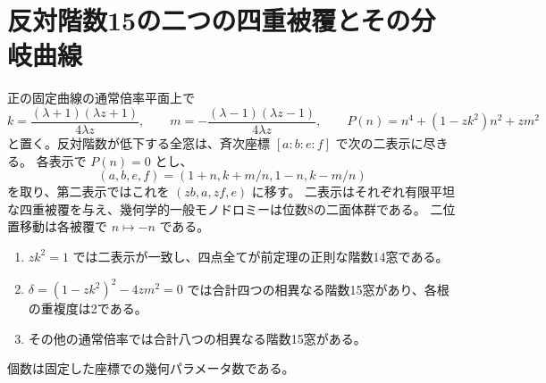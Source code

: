 \section{反対階数15の二つの四重被覆とその分岐曲線}
\label{sec:rank-fifteen-covers}
\begin{theorem}\label{thm:rank-fifteen-covers}
正の固定曲線の通常倍率平面上で
\[
 k=\frac{(\lambda+1)(\lambda z+1)}{4\lambda z},\qquad
 m=-\frac{(\lambda-1)(\lambda z-1)}{4\lambda z},\qquad
 P(n)=n^4+(1-zk^2)n^2+zm^2
\]
と置く。反対階数が低下する全窓は、斉次座標 $[a:b:e:f]$ で次の二表示に尽きる。
各表示で $P(n)=0$ とし、
\[
 (a,b,e,f)=(1+n,k+m/n,1-n,k-m/n)
\]
を取り、第二表示ではこれを $(zb,a,zf,e)$ に移す。
二表示はそれぞれ有限平坦な四重被覆を与え、幾何学的一般モノドロミーは位数8の二面体群である。
二位置移動は各被覆で $n\mapsto-n$ である。
\begin{enumerate}
\item $zk^2=1$ では二表示が一致し、四点全てが前定理の正則な階数14窓である。
\item $\delta=(1-zk^2)^2-4zm^2=0$ では合計四つの相異なる階数15窓があり、各根の重複度は2である。
\item その他の通常倍率では合計八つの相異なる階数15窓がある。
\end{enumerate}
個数は固定した座標での幾何パラメータ数である。
\end{theorem}
